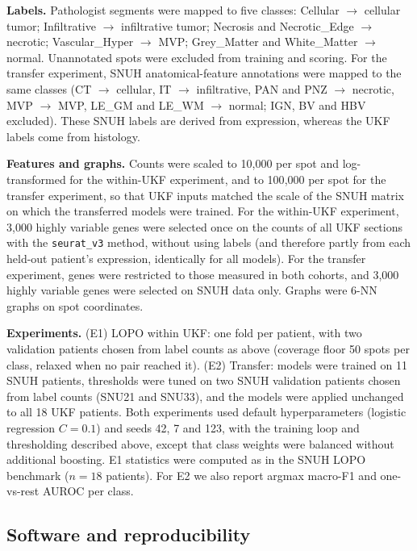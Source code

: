 \documentclass[11pt,letterpaper]{article}
\begin{document}
\textbf{Labels.} Pathologist segments were mapped to five classes: Cellular $\rightarrow$ cellular tumor; Infiltrative $\rightarrow$ infiltrative tumor; Necrosis and Necrotic\_Edge $\rightarrow$ necrotic; Vascular\_Hyper $\rightarrow$ MVP; Grey\_Matter and White\_Matter $\rightarrow$ normal. Unannotated spots were excluded from training and scoring. For the transfer experiment, SNUH anatomical-feature annotations were mapped to the same classes (CT $\rightarrow$ cellular, IT $\rightarrow$ infiltrative, PAN and PNZ $\rightarrow$ necrotic, MVP $\rightarrow$ MVP, LE\_GM and LE\_WM $\rightarrow$ normal; IGN, BV and HBV excluded). These SNUH labels are derived from expression, whereas the UKF labels come from histology.

\textbf{Features and graphs.} Counts were scaled to 10{,}000 per spot and log-transformed for the within-UKF experiment, and to 100{,}000 per spot for the transfer experiment, so that UKF inputs matched the scale of the SNUH matrix on which the transferred models were trained. For the within-UKF experiment, 3{,}000 highly variable genes were selected once on the counts of all UKF sections with the \texttt{seurat\_v3} method, without using labels (and therefore partly from each held-out patient's expression, identically for all models). For the transfer experiment, genes were restricted to those measured in both cohorts, and 3{,}000 highly variable genes were selected on SNUH data only. Graphs were 6-NN graphs on spot coordinates.

\textbf{Experiments.} (E1) LOPO within UKF: one fold per patient, with two validation patients chosen from label counts as above (coverage floor 50 spots per class, relaxed when no pair reached it). (E2) Transfer: models were trained on 11 SNUH patients, thresholds were tuned on two SNUH validation patients chosen from label counts (SNU21 and SNU33), and the models were applied unchanged to all 18 UKF patients. Both experiments used default hyperparameters (logistic regression $C = 0.1$) and seeds 42, 7 and 123, with the training loop and thresholding described above, except that class weights were balanced without additional boosting. E1 statistics were computed as in the SNUH LOPO benchmark ($n = 18$ patients). For E2 we also report argmax macro-F1 and one-vs-rest AUROC per class.

\subsection{Software and reproducibility}
\end{document}
